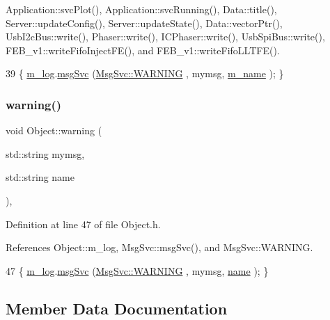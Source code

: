 Application\+::svc\+Plot(), Application\+::svc\+Running(), Data\+::title(), Server\+::update\+Config(), Server\+::update\+State(), Data\+::vector\+Ptr(), Usb\+I2c\+Bus\+::write(), Phaser\+::write(), I\+C\+Phaser\+::write(), Usb\+Spi\+Bus\+::write(), F\+E\+B\+\_\+v1\+::write\+Fifo\+Inject\+F\+E(), and F\+E\+B\+\_\+v1\+::write\+Fifo\+L\+L\+T\+F\+E().


\begin{DoxyCode}
39 \{ \hyperlink{classObject_a0d269813dd7ac1f24bc143031e2963f2}{m\_log}.\hyperlink{classMsgSvc_ad25f18047920cc59a314e5098259711c}{msgSvc} (\hyperlink{classMsgSvc_ae671eb7301996cd049d2da8a65925926a7cefae88f2ba26b2b05b676a383c834b}{MsgSvc::WARNING} , mymsg, \hyperlink{classObject_a8b83c95c705d2c3ba0d081fe1710f48d}{m\_name} ); \}
\end{DoxyCode}
\mbox{\label{classObject_a11f101db4dd73d9391b0231818881d86}} 
\subsubsection{\texorpdfstring{warning()}{warning()}\hspace{0.1cm}{\footnotesize\ttfamily [2/2]}}
{\footnotesize\ttfamily void Object\+::warning (\begin{DoxyParamCaption}\item[{std\+::string}]{mymsg,  }\item[{std\+::string}]{name }\end{DoxyParamCaption})\hspace{0.3cm}{\ttfamily [inline]}, {\ttfamily [inherited]}}



Definition at line 47 of file Object.\+h.



References Object\+::m\+\_\+log, Msg\+Svc\+::msg\+Svc(), and Msg\+Svc\+::\+W\+A\+R\+N\+I\+NG.


\begin{DoxyCode}
47 \{ \hyperlink{classObject_a0d269813dd7ac1f24bc143031e2963f2}{m\_log}.\hyperlink{classMsgSvc_ad25f18047920cc59a314e5098259711c}{msgSvc} (\hyperlink{classMsgSvc_ae671eb7301996cd049d2da8a65925926a7cefae88f2ba26b2b05b676a383c834b}{MsgSvc::WARNING} , mymsg, \hyperlink{classObject_a300f4c05dd468c7bb8b3c968868443c1}{name} ); \}
\end{DoxyCode}


\subsection{Member Data Documentation}
\mbox{\label{classAcquisition_a88963f722bfcde824882f6312a44e825}} 
